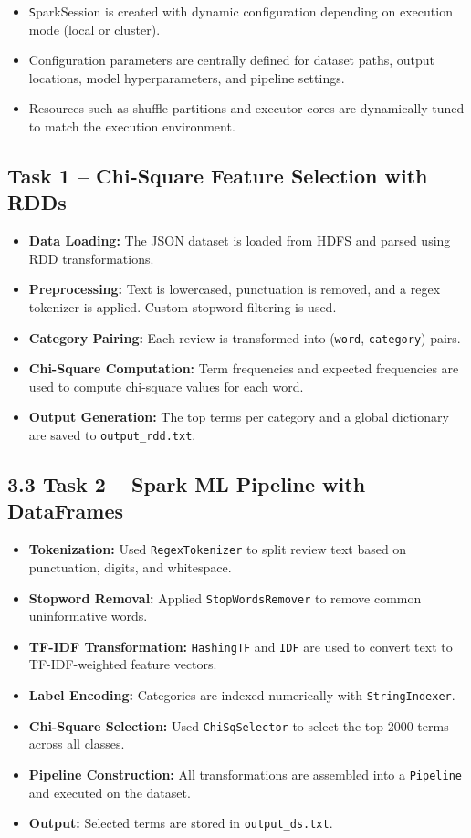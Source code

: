 \documentclass[12pt]{article}
\begin{document}
\begin{itemize}
  \item \texttt SparkSession is created with dynamic configuration depending on execution mode (local or cluster).
  \item Configuration parameters are centrally defined for dataset paths, output locations, model hyperparameters, and pipeline settings.
    \item Resources such as shuffle partitions and executor cores are dynamically tuned to match the execution environment.
\end{itemize}


\subsection{Task 1 – Chi-Square Feature Selection with RDDs}

\begin{itemize}
  \item \textbf{Data Loading:} The JSON dataset is loaded from HDFS and parsed using RDD transformations.
  \item \textbf{Preprocessing:} Text is lowercased, punctuation is removed, and a regex tokenizer is applied. Custom stopword filtering is used.
  \item \textbf{Category Pairing:} Each review is transformed into (\texttt{word}, \texttt{category}) pairs.
  \item \textbf{Chi-Square Computation:} Term frequencies and expected frequencies are used to compute chi-square values for each word.
  \item \textbf{Output Generation:} The top terms per category and a global dictionary are saved to \texttt{output\_rdd.txt}.
\end{itemize}

\subsection*{3.3 Task 2 – Spark ML Pipeline with DataFrames}

\begin{itemize}
  \item \textbf{Tokenization:} Used \texttt{RegexTokenizer} to split review text based on punctuation, digits, and whitespace.
  \item \textbf{Stopword Removal:} Applied \texttt{StopWordsRemover} to remove common uninformative words.
  \item \textbf{TF-IDF Transformation:} \texttt{HashingTF} and \texttt{IDF} are used to convert text to TF-IDF-weighted feature vectors.
  \item \textbf{Label Encoding:} Categories are indexed numerically with \texttt{StringIndexer}.
  \item \textbf{Chi-Square Selection:} Used \texttt{ChiSqSelector} to select the top 2000 terms across all classes.
  \item \textbf{Pipeline Construction:} All transformations are assembled into a \texttt{Pipeline} and executed on the dataset.
  \item \textbf{Output:} Selected terms are stored in \texttt{output\_ds.txt}.
\end{itemize}
\end{document}
